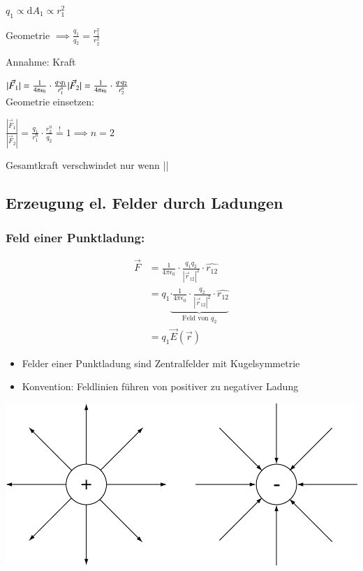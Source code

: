 \documentclass[11pt]{article}
\begin{document}
$q_1 \propto \mathrm{d}A_1 \propto r_1^2$

Geometrie $\implies \frac{q_1}{q_2} = \frac{r_1^2}{r_2^2}$

Annahme: Kraft \propto {}

$\vert\vec{F}_1\vert = \frac{1}{4\pi\epsilon_0}\cdot\frac{q\cdot q_1}{r_1^n}\\
\vert\vec{F}_2\vert = \frac{1}{4\pi\epsilon_0}\cdot\frac{q\cdot q_2}{r_2^n}$\\

Geometrie einsetzen: 

$\frac{|\vec{F}_1|}{|\vec{F}_2|} = \frac{q_1}{r_1^n}\cdot \frac{r_2^n}{q_2} \overset{!}{=} 1 \implies n = 2$

Gesamtkraft verschwindet nur wenn || \propto {}

\subsection{Erzeugung el. Felder durch Ladungen}

	\subsubsection{Feld einer Punktladung:}
	
	\begin{align*}
		\vec{F} &= \frac{1}{4\pi\epsilon_0} \cdot \frac{q_1 q_2}{ |\vec{r}_{12}|^2 } \cdot \hat{r_{12}} \\
					&=q_1 \underbrace{ \cdot \frac{1}{4\pi\epsilon_0} \cdot \frac{q_2}{ |\vec{r}_{12}|^2 } \cdot \hat{r_{12}}  }_{\text{Feld von }q_2} \\
					&=q_1 \vec{E}(\vec{r})
	\end{align*}
	\begin{itemize}
		\item Felder einer Punktladung sind Zentralfelder mit Kugelsymmetrie
		\item Konvention: Feldlinien führen von positiver zu negativer Ladung
	\end{itemize}
	\begin{center}
		\includegraphics[width=0.7\linewidth]{skizzen/14/14_4B0}
	\end{center}
\end{document}
